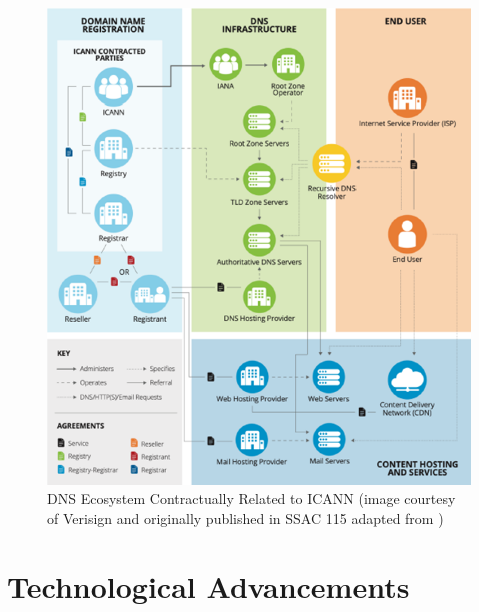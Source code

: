 \captionsetup{font= footnotesize}
\begin{figure}[H]
\centering
    \includegraphics[width=1.0\linewidth]{background/DNSECO.png}
    \caption{DNS Ecosystem Contractually Related to ICANN (image
courtesy of Verisign and originally published in SSAC 115 adapted from \cite{SSAC2023SAC115})}
    \label{fig:fig14}
\end{figure}
\clearpage

\section{Technological Advancements}

